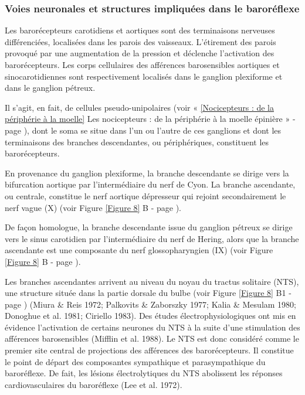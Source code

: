 \documentclass[a4paper,12pt,twoside]{report}
\begin{document}
\subsubsection{Voies neuronales et structures impliquées dans le baroréflexe}

Les barorécepteurs carotidiens et aortiques sont des terminaisons nerveuses différenciées, localisées dans les parois des vaisseaux. L’étirement des parois provoqué par une augmentation de la pression et déclenche l’activation des barorécepteurs. Les corps cellulaires des afférences barosensibles aortiques et sinocarotidiennes sont respectivement localisés dans le ganglion plexiforme et dans le ganglion pétreux.

Il s’agit, en fait, de cellules pseudo-unipolaires (voir « \ref{Nocicepteurs : de la périphérie à la moelle} Les nocicepteurs : de la périphérie à la moelle épinière » - page \pageref{Nocicepteurs : de la périphérie à la moelle}), dont le soma se situe dans l’un ou l’autre de ces ganglions et dont les terminaisons des branches descendantes, ou périphériques, constituent les barorécepteurs. 

En provenance du ganglion plexiforme, la branche descendante se dirige vers la bifurcation aortique par l’intermédiaire du nerf de Cyon. La branche ascendante, ou centrale, constitue le nerf aortique dépresseur qui rejoint secondairement le nerf vague (X) (voir Figure \ref{Figure 8} B - page \pageref{Figure 8}).

De façon homologue, la branche descendante issue du ganglion pétreux se dirige vers le sinus carotidien par l’intermédiaire du nerf de Hering, alors que la branche ascendante est une composante du nerf glossopharyngien (IX) (voir Figure \ref{Figure 8} B - page \pageref{Figure 8}). 

Les branches ascendantes arrivent au niveau du noyau du tractus solitaire (NTS), une structure située dans la partie dorsale du bulbe (voir Figure \ref{Figure 8} B1 - page \pageref{Figure 8}) (Miura \& Reis 1972; Palkovits \& Zaborszky 1977; Kalia \& Mesulam 1980; Donoghue et al. 1981; Ciriello 1983). Des études électrophysiologiques ont mis en évidence l’activation de certains neurones du NTS à la suite d’une stimulation des afférences barosensibles (Mifflin et al. 1988). Le NTS est donc considéré comme le premier site central de projections des afférences des barorécepteurs. Il constitue le point de départ des composantes sympathique et parasympathique du baroréflexe. De fait, les lésions électrolytiques du NTS abolissent les réponses cardiovasculaires du baroréflexe (Lee et al. 1972). 
\end{document}
